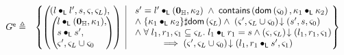 \begin{definition}[Guarantee]
\[
\begin{array}{r l}

	\extendG \eqdef &
 	\left\{
 	\hspace*{-0.2cm}
	 \begin{array}{l | r}
	   \left(
	   \hspace*{-0.2cm}
	   \begin{array}{l}
	     (l \composeL l', s, \amod{}, \amod{L}),\\
 	     \left(
	     \hspace*{-0.2cm}
	     \begin{array}{l}
	      l \composeL (\unitH, \ca{1}),\\
	      s \composeL s',\\
	      \amod{}', \amod{L} \cup \amod{0}
	     \end{array}
 	    \hspace*{-0.2cm}
 	    \right)
	   \end{array}
	   \hspace*{-0.2cm}
 	  \right)
	   &
 	  \begin{array}{l}
 	  	s' = l' \composeL (\unitH, \ca{2})  \;\land\; \contains{\dom{\amod{0}}}{\ca{1} \composeL \ca{2}}\\
 	  	
 	  	\land\; \{\ca{1} \composeL \ca{2}\} \disjoint \dom{\amod{L}}
			\land\; \extendsAM{\amod{}', \amod{L} \cup \amod{0}}{s'}{s}{\amod{0}}\\
			
			\land\; \for{l_1, r_1, \amod{1} \subseteq \amod{L}} l_1 \composeL r_1 = s \land \extendsAM{\amod{}, \amod{L}}{l_1}{r_1}{\amod{1}}  \\
			\hspace*{1cm} \implies\extendsAM{\amod{}', \amod{L} \cup \amod{0}}{l_1}{r_1 \composeL s'}{\amod{1}}
			
     	
   	\end{array}
   	\hspace*{-0.15cm}
 	\end{array}
 	\hspace*{-0.2cm}
	\right\}\\\\
	

\end{array}\]
\end{definition}
